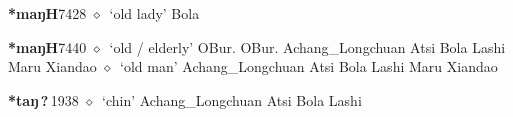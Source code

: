   \begin{list}{}{\leftmargin=1.5em \itemindent=-1.5em}
  \item {\footnotesize \textbf{*maŋH}}{\tiny 7428}
         $\diamond$~`old lady'
         Bola 
  \item {\footnotesize \textbf{*maŋH}}{\tiny 7440}
\hspace{1ex}
         $\diamond$~`old / elderly'
         OBur. 
\hspace{1ex}
         OBur. 
\hspace{1ex}
         Achang\_Longchuan 
\hspace{1ex}
         Atsi 
\hspace{1ex}
         Bola 
\hspace{1ex}
         Lashi 
\hspace{1ex}
         Maru 
\hspace{1ex}
         Xiandao 
\hspace{1ex}
         $\diamond$~`old man'
         Achang\_Longchuan 
\hspace{1ex}
         Atsi 
\hspace{1ex}
         Bola 
\hspace{1ex}
         Lashi 
\hspace{1ex}
         Maru 
\hspace{1ex}
         Xiandao 
  \item {\footnotesize \textbf{*taŋ\,?\,}}{\tiny 1938}
\hspace{1ex}
         $\diamond$~`chin'
         Achang\_Longchuan 
\hspace{1ex}
         Atsi 
\hspace{1ex}
         Bola 
\hspace{1ex}
         Lashi 
\hspace{1ex}

\end{list}
